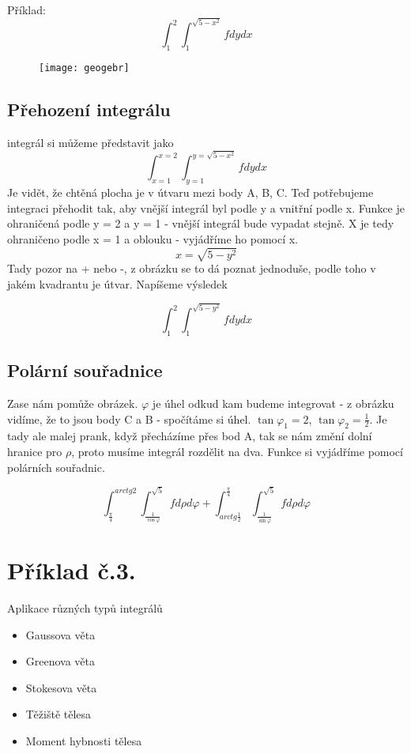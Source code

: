 \documentclass[12pt, letterpaper]{article}
\begin{document}
Příklad:
\[\int_1^2\int_1^{\sqrt{5-x^2}}  f dy dx\]

\begin{figure}[h]
	\centering
	\texttt{[image: geogebr]}
\end{figure}

\subsection*{Přehození integrálu}

integrál si můžeme představit jako \[\int_{x = 1}^{x = 2}\int_{y = 1}^{y = \sqrt{5-x^2}}  f dy dx\]
Je vidět, že chtěná plocha je v útvaru mezi body A, B, C.
Teď potřebujeme integraci přehodit tak, aby vnější integrál byl podle y a vnitřní podle x.
Funkce je ohraničená podle y = 2 a y = 1 - vnější integrál bude vypadat stejně.
X je tedy ohraničeno podle x = 1 a oblouku - vyjádříme ho pomocí x. \[x = \sqrt{5-y^2}\]
Tady pozor na + nebo -, z obrázku se to dá poznat jednoduše, podle toho v jakém kvadrantu je útvar.
Napíšeme výsledek

\[\int_1^2\int_1^{\sqrt{5-y^2}}  f dy dx\]

\subsection*{Polární souřadnice}

Zase nám pomůže obrázek. $\varphi$ je úhel odkud kam budeme integrovat - z obrázku vidíme, že to jsou body C a B - spočítáme si úhel. $\tan \varphi_1 = 2$, $\tan \varphi_2 = \frac{1}{2}$.
Je tady ale malej prank, když přecházíme přes bod A, tak se nám změní dolní hranice pro $\rho$, proto musíme integrál rozdělit na dva. Funkce si vyjádříme pomocí polárních souřadnic.

\[\int_{\frac{\pi}{4}}^{arctg 2}   \int_{\frac{1}{\cos{\varphi}}}^{\sqrt{5}}  f    d\rho d\varphi +  \int_{arctg \frac{1}{2}}^{\frac{\pi}{4}} \int_{\frac{1}{\sin{\varphi}}}^{\sqrt{5}}  f d\rho d\varphi   \]


\section*{Příklad č.3.}

Aplikace různých typů integrálů

\begin{itemize}
	\item Gaussova věta
  	\item Greenova věta
	\item Stokesova věta
	\item Těžiště tělesa
	\item Moment hybnosti tělesa
\end{itemize}
\end{document}
